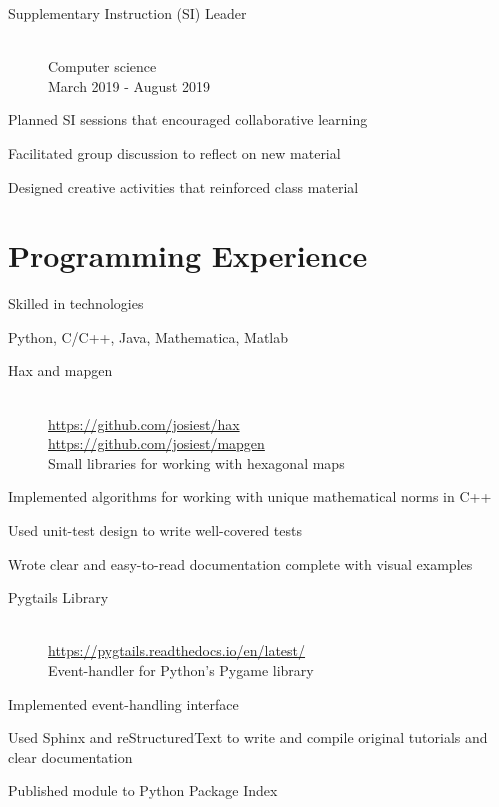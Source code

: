 \documentclass[10pt]{article}
\newenvironment{itemize*}
{\begin{itemize}[leftmargin=*]
    \setlength{\itemsep}{0pt}
    \setlength{\parskip}{0pt}}
{\end{itemize}}
\begin{document}
\begin{paracol}{2}
\begin{description}
\item[Supplementary Instruction (SI) Leader]~\\
    Computer science\\
    March 2019 - August 2019
\end{description}
\begin{itemize*}
\item Planned SI sessions that encouraged collaborative learning
\item Facilitated group discussion to reflect on new material
\item Designed creative activities that reinforced class material
\end{itemize*}

\switchcolumn
\section*{Programming Experience}
\begin{description}
\item[Skilled in technologies]
\end{description}
\begin{itemize*}
\item Python, C/C++, Java, Mathematica, Matlab
\end{itemize*}

\begin{description}
\item[Hax and mapgen]~\\
    \url{https://github.com/josiest/hax}\\
    \url{https://github.com/josiest/mapgen}\\
    Small libraries for working with hexagonal maps
\end{description}
\begin{itemize*}
\item Implemented algorithms for working with unique mathematical norms in C++
\item Used unit-test design to write well-covered tests
\item Wrote clear and easy-to-read documentation complete with visual examples
\end{itemize*}

\begin{description}
\item[Pygtails Library]~\\
    \url{https://pygtails.readthedocs.io/en/latest/}\\
    Event-handler for Python's Pygame library
\end{description}
\begin{itemize*}
\item Implemented event-handling interface
\item Used Sphinx and reStructuredText to write and compile original tutorials and clear
      documentation
\item Published module to Python Package Index
\end{itemize*}


\end{paracol}
\end{document}
